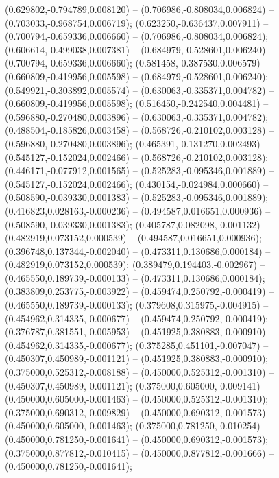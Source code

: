  (0.629802,-0.794789,0.008120) -- (0.706986,-0.808034,0.006824) -- (0.703033,-0.968754,0.006719);
 (0.623250,-0.636437,0.007911) -- (0.700794,-0.659336,0.006660) -- (0.706986,-0.808034,0.006824);
 (0.606614,-0.499038,0.007381) -- (0.684979,-0.528601,0.006240) -- (0.700794,-0.659336,0.006660);
 (0.581458,-0.387530,0.006579) -- (0.660809,-0.419956,0.005598) -- (0.684979,-0.528601,0.006240);
 (0.549921,-0.303892,0.005574) -- (0.630063,-0.335371,0.004782) -- (0.660809,-0.419956,0.005598);
 (0.516450,-0.242540,0.004481) -- (0.596880,-0.270480,0.003896) -- (0.630063,-0.335371,0.004782);
 (0.488504,-0.185826,0.003458) -- (0.568726,-0.210102,0.003128) -- (0.596880,-0.270480,0.003896);
 (0.465391,-0.131270,0.002493) -- (0.545127,-0.152024,0.002466) -- (0.568726,-0.210102,0.003128);
 (0.446171,-0.077912,0.001565) -- (0.525283,-0.095346,0.001889) -- (0.545127,-0.152024,0.002466);
 (0.430154,-0.024984,0.000660) -- (0.508590,-0.039330,0.001383) -- (0.525283,-0.095346,0.001889);
 (0.416823,0.028163,-0.000236) -- (0.494587,0.016651,0.000936) -- (0.508590,-0.039330,0.001383);
 (0.405787,0.082098,-0.001132) -- (0.482919,0.073152,0.000539) -- (0.494587,0.016651,0.000936);
 (0.396748,0.137344,-0.002040) -- (0.473311,0.130686,0.000184) -- (0.482919,0.073152,0.000539);
 (0.389479,0.194403,-0.002967) -- (0.465550,0.189739,-0.000133) -- (0.473311,0.130686,0.000184);
 (0.383809,0.253775,-0.003922) -- (0.459474,0.250792,-0.000419) -- (0.465550,0.189739,-0.000133);
 (0.379608,0.315975,-0.004915) -- (0.454962,0.314335,-0.000677) -- (0.459474,0.250792,-0.000419);
 (0.376787,0.381551,-0.005953) -- (0.451925,0.380883,-0.000910) -- (0.454962,0.314335,-0.000677);
 (0.375285,0.451101,-0.007047) -- (0.450307,0.450989,-0.001121) -- (0.451925,0.380883,-0.000910);
 (0.375000,0.525312,-0.008188) -- (0.450000,0.525312,-0.001310) -- (0.450307,0.450989,-0.001121);
 (0.375000,0.605000,-0.009141) -- (0.450000,0.605000,-0.001463) -- (0.450000,0.525312,-0.001310);
 (0.375000,0.690312,-0.009829) -- (0.450000,0.690312,-0.001573) -- (0.450000,0.605000,-0.001463);
 (0.375000,0.781250,-0.010254) -- (0.450000,0.781250,-0.001641) -- (0.450000,0.690312,-0.001573);
 (0.375000,0.877812,-0.010415) -- (0.450000,0.877812,-0.001666) -- (0.450000,0.781250,-0.001641);
